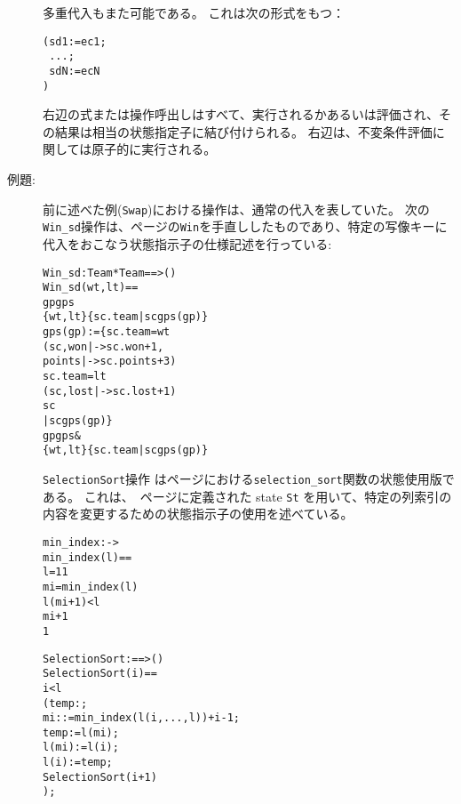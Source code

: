 \documentclass[\pformat,12pt]{jarticle}
\begin{document}
\begin{description}
 多重代入もまた可能である。
これは次の形式をもつ：
  \begin{alltt}
     (sd1 := ec1;
\           ...;
\           sdN := ecN
           )
  \end{alltt}
右辺の式または操作呼出しはすべて、実行されるかあるいは評価され、その結果は相当の状態指定子に結び付けられる。
右辺は、不変条件評価に関しては原子的に実行される。

\item[例題:] 前に述べた例(\texttt{Swap})における操作は、通常の代入を表していた。
次の\texttt{Win\_sd}操作は、\pageref{winDef}ページの\texttt{Win}を手直ししたものであり、特定の写像キーに代入をおこなう状態指示子の仕様記述を行っている:
  \begin{alltt}
  Win_sd : Team * Team ==> ()
  Win_sd (wt,lt) ==
     gp  gps  
        \{wt,lt\}  \{sc.team | sc  gps(gp)\}
     gps(gp) := \{  sc.team = wt
                   (sc, won |-> sc.won + 1,
                               points |-> sc.points + 3)
                    sc.team = lt
                   (sc, lost |-> sc.lost + 1)
                    sc 
                 | sc  gps(gp)\}
    gp  gps & 
                 \{wt,lt\}  \{sc.team | sc  gps(gp)\}
  \end{alltt}
\texttt{SelectionSort}操作 は\pageref{selectionSortdef}ページにおける\texttt{selection\_sort}関数の状態使用版である。
これは、~\pageref{stdef}ページに定義された
state \texttt{St}
を用いて、特定の列索引の内容を変更するための状態指示子の使用を述べている。 
  \begin{alltt}
 
  min_index :  -> 
  min_index(l) ==
   l = 1  1
   mi = min_index( l)
      l(mi+1) <  l
        mi+1
        1


  SelectionSort :  ==> ()
  SelectionSort (i) ==
     i <  l
     ( temp: ;
          mi :  := min_index(l(i,..., l)) + i - 1;
         temp := l(mi);
         l(mi) := l(i);
         l(i) := temp;
         SelectionSort(i+1)
        );
  \end{alltt}

\end{description}
\end{document}
